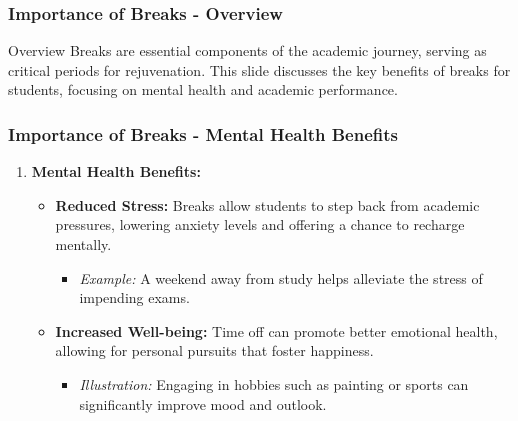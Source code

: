 \documentclass[aspectratio=169]{beamer}
\begin{document}
\begin{frame}[fragile]
    \frametitle{Importance of Breaks - Overview}
    \begin{block}{Overview}
        Breaks are essential components of the academic journey, serving as critical periods for rejuvenation. This slide discusses the key benefits of breaks for students, focusing on mental health and academic performance.
    \end{block}
\end{frame}

\begin{frame}[fragile]
    \frametitle{Importance of Breaks - Mental Health Benefits}
    \begin{enumerate}
        \item \textbf{Mental Health Benefits:}
        \begin{itemize}
            \item \textbf{Reduced Stress:} Breaks allow students to step back from academic pressures, lowering anxiety levels and offering a chance to recharge mentally.
            \begin{itemize}
                \item \textit{Example:} A weekend away from study helps alleviate the stress of impending exams.
            \end{itemize}
            \item \textbf{Increased Well-being:} Time off can promote better emotional health, allowing for personal pursuits that foster happiness.
            \begin{itemize}
                \item \textit{Illustration:} Engaging in hobbies such as painting or sports can significantly improve mood and outlook.
            \end{itemize}
        \end{itemize}
    \end{enumerate}
\end{frame}
\end{document}
